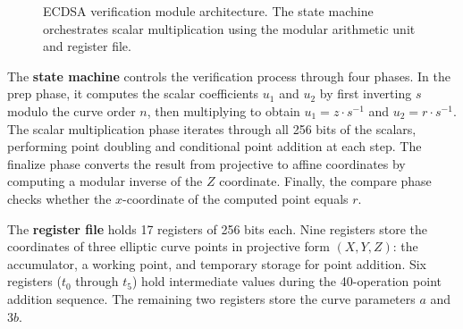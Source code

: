 \documentclass{article}
\begin{document}
\begin{appendices}
\begin{figure}[h]
\begin{center}
\caption{ECDSA verification module architecture. The state machine orchestrates scalar multiplication using the modular arithmetic unit and register file.}
\label{fig:ecdsa_architecture}
\end{center}
\end{figure}

The \textbf{state machine} controls the verification process through four phases. In the prep phase, it computes the scalar coefficients $u_1$ and $u_2$ by first inverting $s$ modulo the curve order $n$, then multiplying to obtain $u_1 = z \cdot s^{-1}$ and $u_2 = r \cdot s^{-1}$. The scalar multiplication phase iterates through all 256 bits of the scalars, performing point doubling and conditional point addition at each step. The finalize phase converts the result from projective to affine coordinates by computing a modular inverse of the $Z$ coordinate. Finally, the compare phase checks whether the $x$-coordinate of the computed point equals $r$.

The \textbf{register file} holds 17 registers of 256 bits each. Nine registers store the coordinates of three elliptic curve points in projective form $(X, Y, Z)$: the accumulator, a working point, and temporary storage for point addition. Six registers ($t_0$ through $t_5$) hold intermediate values during the 40-operation point addition sequence. The remaining two registers store the curve parameters $a$ and $3b$.


\end{appendices}
\end{document}
